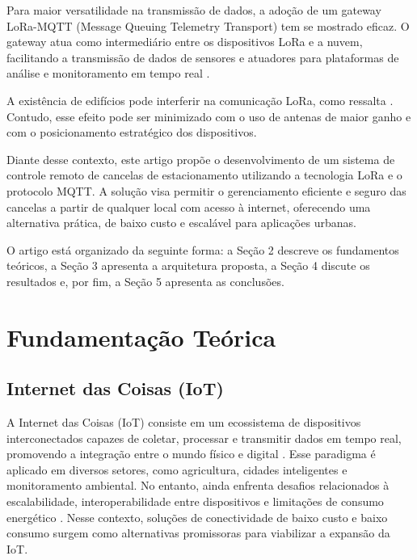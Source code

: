 \documentclass[
article,			%
11pt,				%
twoside,			%
a4paper,			%
section=TITLE,		%
onecolumn,          %
english,			%
brazil,				%
sumario=tradicional
]{abntex2}
\begin{document}
    Para maior versatilidade na transmissão de dados, a adoção de um gateway LoRa-MQTT (Message Queuing Telemetry Transport) tem se mostrado eficaz. O gateway atua como intermediário entre os dispositivos LoRa e a nuvem, facilitando a transmissão de dados de sensores e atuadores para plataformas de análise e monitoramento em tempo real \cite{Bhawiyuga2019}.

    A existência de edifícios pode interferir na comunicação LoRa, como ressalta \cite{lima2023}. Contudo, esse efeito pode ser minimizado com o uso de antenas de maior ganho e com o posicionamento estratégico dos dispositivos.

    Diante desse contexto, este artigo propõe o desenvolvimento de um sistema de controle remoto de cancelas de estacionamento utilizando a tecnologia LoRa e o protocolo MQTT. A solução visa permitir o gerenciamento eficiente e seguro das cancelas a partir de qualquer local com acesso à internet, oferecendo uma alternativa prática, de baixo custo e escalável para aplicações urbanas.

    O artigo está organizado da seguinte forma: a Seção 2 descreve os fundamentos teóricos, a Seção 3 apresenta a arquitetura proposta, a Seção 4 discute os resultados e, por fim, a Seção 5 apresenta as conclusões.


\section{Fundamentação Teórica}

    \subsection{Internet das Coisas (IoT)}
    A Internet das Coisas (IoT) consiste em um ecossistema de dispositivos interconectados capazes de coletar, processar e transmitir dados em tempo real, promovendo a integração entre o mundo físico e digital \cite{lima2023}. Esse paradigma é aplicado em diversos setores, como agricultura, cidades inteligentes e monitoramento ambiental. No entanto, ainda enfrenta desafios relacionados à escalabilidade, interoperabilidade entre dispositivos e limitações de consumo energético \cite{huh2019}. Nesse contexto, soluções de conectividade de baixo custo e baixo consumo surgem como alternativas promissoras para viabilizar a expansão da IoT.
\end{document}
